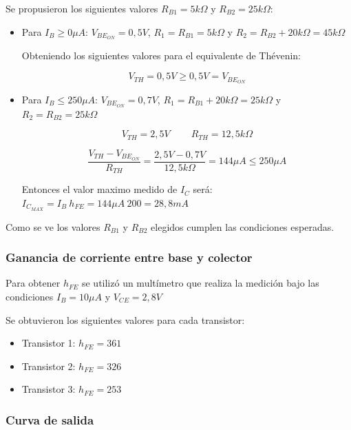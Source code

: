 \documentclass[10pt,spanish,a4paper,openany,notitlepage]{article}
\begin{document}
Se propusieron los siguientes valores $R_{B1} = 5\unit{k\Omega}$ y $R_{B2} = 25\unit{k\Omega}$:

\begin{itemize}
\item{Para $I_B \geq 0 \unit{\mu A}$}: $V_{BE_{ON}} = 0,5 \unit{V}$, $R_1 = R_{B1} = 5 \unit{k\Omega}$ y $R_2 = R_{B2} + 20\unit{k\Omega} = 45 \unit{k\Omega}$

Obteniendo los siguientes valores para el equivalente de Thévenin:

\[ \displaystyle V_{TH} =  0,5 \unit{V} \geq 0,5 \unit{V} = V_{BE_{ON}}\]

\item{Para $I_B \leq 250 \unit{\mu A}$}: $V_{BE_{ON}} = 0,7 \unit{V}$, $R_1 = R_{B1}+ 20\unit{k\Omega} = 25 \unit{k\Omega}$ y $R_2 = R_{B2} = 25 \unit{k\Omega}$

\[ \displaystyle V_{TH} =  2,5 \unit{V} \ \ \ \ \ \ \ \ \ \  R_{TH} = 12,5 \unit{k\Omega}\]

\[ \displaystyle \frac{V_{TH} - V_{BE_{ON}}}{R_{TH}} = \frac{2,5 \unit{V} - 0,7 \unit{V}}{12,5 \unit{k\Omega}} = 144 \unit{\mu A} \leq 250 \unit{\mu A} \]

Entonces el valor maximo medido de $I_C$ será: $I_{C_{MAX}} = I_B\ h_{FE} = 144 \unit{\mu A}\ 200 = 28,8 \unit{mA}$

\end{itemize}

Como se ve los valores $R_{B1}$ y $R_{B2}$ elegidos cumplen las condiciones esperadas.

\subsubsection{Ganancia de corriente entre base y colector}

Para obtener $h_{FE}$ se utilizó un multímetro que realiza la medición bajo las condiciones $I_B = 10 \unit{\mu A}$ y $V_{CE} = 2,8 \unit{V}$

Se obtuvieron los siguientes valores para cada transistor:

\begin{itemize}
\item{Transistor 1:} $h_{FE} = 361$
\item{Transistor 2:} $h_{FE} = 326$
\item{Transistor 3:} $h_{FE} = 253$
\end{itemize}

\subsubsection{Curva de salida}
\end{document}
